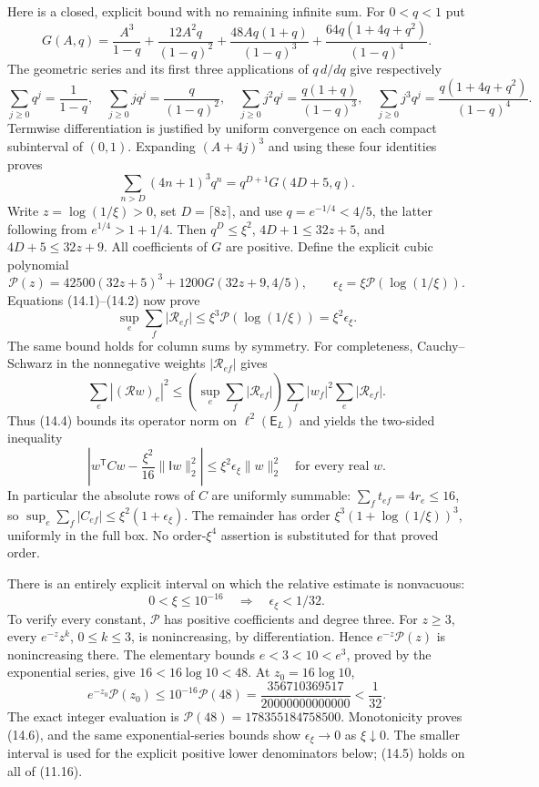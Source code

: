 \documentclass[
]{article}
\begin{document}
Here is a closed, explicit bound with no remaining infinite sum. For
\(0<q<1\) put \[
G(A,q)=\frac{A^3}{1-q}
 +\frac{12A^2q}{(1-q)^2}
 +\frac{48Aq(1+q)}{(1-q)^3}
 +\frac{64q(1+4q+q^2)}{(1-q)^4}.
\] The geometric series and its first three applications of \(q\,d/dq\)
give respectively \[
\sum_{j\ge0}q^j=\frac1{1-q},\quad
\sum_{j\ge0}jq^j=\frac q{(1-q)^2},\quad
\sum_{j\ge0}j^2q^j=\frac{q(1+q)}{(1-q)^3},\quad
\sum_{j\ge0}j^3q^j=\frac{q(1+4q+q^2)}{(1-q)^4}.
\] Termwise differentiation is justified by uniform convergence on each
compact subinterval of \((0,1)\). Expanding \((A+4j)^3\) and using these
four identities proves \[
\sum_{n>D}(4n+1)^3q^n=q^{D+1}G(4D+5,q).                      \tag{14.2}
\] Write \(z=\log(1/\xi)>0\), set \(D=\lceil8z\rceil\), and use
\(q=e^{-1/4}<4/5\), the latter following from \(e^{1/4}>1+1/4\). Then
\(q^D\le\xi^2\), \(4D+1\le32z+5\), and \(4D+5\le32z+9\). All
coefficients of \(G\) are positive. Define the explicit cubic polynomial
\[
\mathcal P(z)=42500(32z+5)^3+1200G(32z+9,4/5),
\qquad \epsilon_\xi=\xi\mathcal P(\log(1/\xi)).              \tag{14.3}
\] Equations (14.1)--(14.2) now prove \[
\sup_e\sum_f|\mathscr R_{ef}|
\le\xi^3\mathcal P(\log(1/\xi))=\xi^2\epsilon_\xi.             \tag{14.4}
\] The same bound holds for column sums by symmetry. For completeness,
Cauchy--Schwarz in the nonnegative weights \(|\mathscr R_{ef}|\) gives
\[
\sum_e|(\mathscr Rw)_e|^2
\le\left(\sup_e\sum_f|\mathscr R_{ef}|\right)
 \sum_f|w_f|^2\sum_e|\mathscr R_{ef}|.
\] Thus (14.4) bounds its operator norm on \(\ell^2(\mathsf E_L)\) and
yields the two-sided inequality \[
\left|w^{\mathsf T}Cw-
          \frac{\xi^2}{16}\|\mathsf Iw\|_2^2\right|
\le\xi^2\epsilon_\xi\|w\|_2^2
\quad\text{for every real }w.                               \tag{14.5}
\] In particular the absolute rows of \(C\) are uniformly summable:
\(\sum_ft_{ef}=4r_e\le16\), so
\(\sup_e\sum_f|C_{ef}|\le\xi^2(1+\epsilon_\xi)\). The remainder has
order \(\xi^3(1+\log(1/\xi))^3\), uniformly in the full box. No
order-\(\xi^4\) assertion is substituted for that proved order.

There is an entirely explicit interval on which the relative estimate is
nonvacuous: \[
0<\xi\le10^{-16}\quad\Longrightarrow\quad\epsilon_\xi<1/32.
                                                               \tag{14.6}
\] To verify every constant, \(\mathcal P\) has positive coefficients
and degree three. For \(z\ge3\), every \(e^{-z}z^k\), \(0\le k\le3\), is
nonincreasing, by differentiation. Hence \(e^{-z}\mathcal P(z)\) is
nonincreasing there. The elementary bounds \(e<3<10<e^3\), proved by the
exponential series, give \(16<16\log10<48\). At \(z_0=16\log10\), \[
e^{-z_0}\mathcal P(z_0)
\le10^{-16}\mathcal P(48)
=\frac{356710369517}{20000000000000}<\frac1{32}.
\] The exact integer evaluation is \(\mathcal P(48)=178355184758500\).
Monotonicity proves (14.6), and the same exponential-series bounds show
\(\epsilon_\xi\to0\) as \(\xi\downarrow0\). The smaller interval is used
for the explicit positive lower denominators below; (14.5) holds on all
of (11.16).
\end{document}

